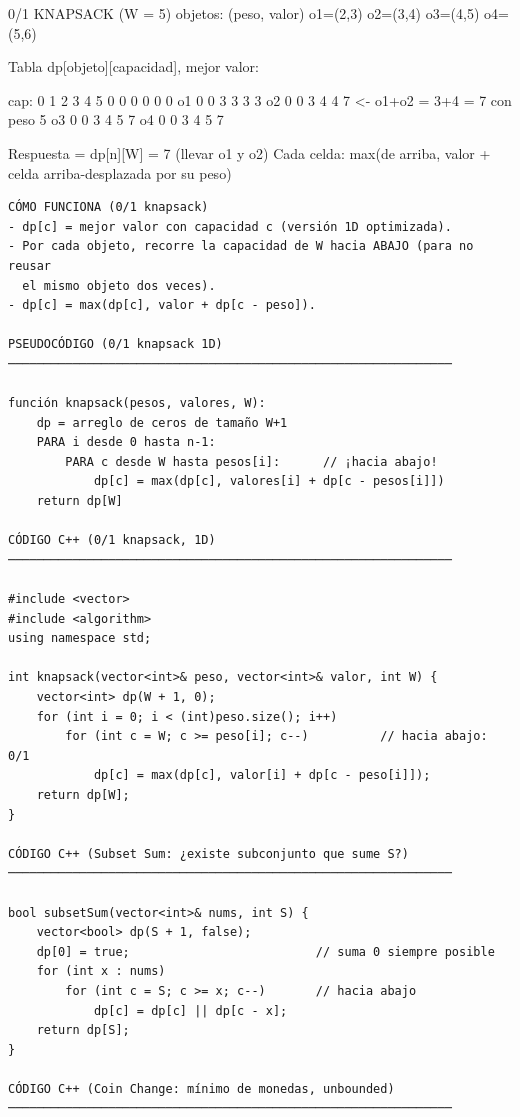 \begin{dsadiagrama}
0/1 KNAPSACK  (W = 5)     objetos: (peso, valor)
  o1=(2,3)  o2=(3,4)  o3=(4,5)  o4=(5,6)

Tabla dp[objeto][capacidad], mejor valor:

 cap:  0  1  2  3  4  5
  {}   0  0  0  0  0  0
  o1   0  0  3  3  3  3
  o2   0  0  3  4  4  7   <- o1+o2 = 3+4 = 7 con peso 5
  o3   0  0  3  4  5  7
  o4   0  0  3  4  5  7

Respuesta = dp[n][W] = 7  (llevar o1 y o2)
Cada celda: max(de arriba, valor + celda arriba-desplazada por su peso)
\end{dsadiagrama}

\begin{lstlisting}
CÓMO FUNCIONA (0/1 knapsack)
- dp[c] = mejor valor con capacidad c (versión 1D optimizada).
- Por cada objeto, recorre la capacidad de W hacia ABAJO (para no reusar
  el mismo objeto dos veces).
- dp[c] = max(dp[c], valor + dp[c - peso]).

PSEUDOCÓDIGO (0/1 knapsack 1D)
──────────────────────────────────────────────────────────────

función knapsack(pesos, valores, W):
    dp = arreglo de ceros de tamaño W+1
    PARA i desde 0 hasta n-1:
        PARA c desde W hasta pesos[i]:      // ¡hacia abajo!
            dp[c] = max(dp[c], valores[i] + dp[c - pesos[i]])
    return dp[W]

CÓDIGO C++ (0/1 knapsack, 1D)
──────────────────────────────────────────────────────────────

#include <vector>
#include <algorithm>
using namespace std;

int knapsack(vector<int>& peso, vector<int>& valor, int W) {
    vector<int> dp(W + 1, 0);
    for (int i = 0; i < (int)peso.size(); i++)
        for (int c = W; c >= peso[i]; c--)          // hacia abajo: 0/1
            dp[c] = max(dp[c], valor[i] + dp[c - peso[i]]);
    return dp[W];
}

CÓDIGO C++ (Subset Sum: ¿existe subconjunto que sume S?)
──────────────────────────────────────────────────────────────

bool subsetSum(vector<int>& nums, int S) {
    vector<bool> dp(S + 1, false);
    dp[0] = true;                          // suma 0 siempre posible
    for (int x : nums)
        for (int c = S; c >= x; c--)       // hacia abajo
            dp[c] = dp[c] || dp[c - x];
    return dp[S];
}

CÓDIGO C++ (Coin Change: mínimo de monedas, unbounded)
──────────────────────────────────────────────────────────────


\end{lstlisting}
